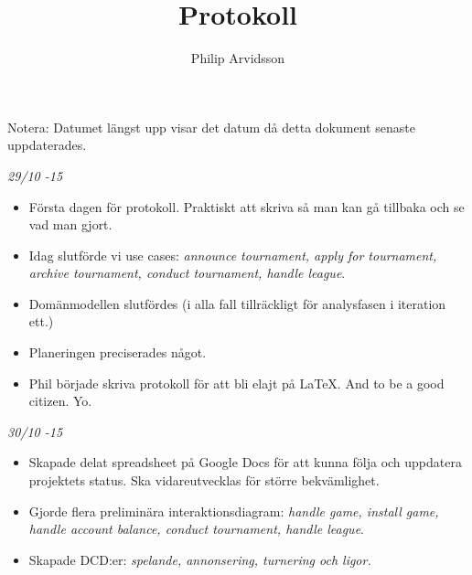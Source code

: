 \documentclass{article}
\title{Protokoll}
\author{Philip Arvidsson}
\begin{document}
    \maketitle

    Notera: Datumet längst upp visar det datum då detta dokument senaste
            uppdaterades.

    \vspace{1.5cm}

    {\large \textit{29/10 -15}}
    \begin{itemize}
        \item Första dagen för protokoll. Praktiskt att skriva så man kan
              gå tillbaka och se vad man gjort.

        \item Idag slutförde vi use cases: \textit{announce tournament,
              apply for tournament, archive tournament, conduct
              tournament, handle league}.

        \item Domänmodellen slutfördes (i alla fall tillräckligt för
              analysfasen i iteration ett.)

        \item Planeringen preciserades något.

        \item Phil började skriva protokoll för att bli elajt på LaTeX.
              And to be a good citizen. Yo.
    \end{itemize}

    {\large \textit{30/10 -15}}
    \begin{itemize}
        \item Skapade delat spreadsheet på Google Docs för att kunna följa
              och uppdatera projektets status. Ska vidareutvecklas för
              större bekvämlighet.

        \item Gjorde flera preliminära interaktionsdiagram: \textit{handle game,
              install game, handle account balance, conduct tournament, handle
              league}.

        \item Skapade DCD:er: \textit{spelande, annonsering, turnering och
              ligor.}
    \end{itemize}
\end{document}

